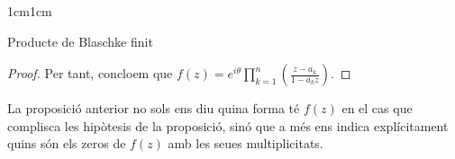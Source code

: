 \begin{adjustwidth}{1cm}{1cm}
\begin{subsection}{Producte de Blaschke finit}
\begin{proof}
        Per tant, concloem que $f(z)=e^{i\theta}\displaystyle\prod^{n}_{k=1}\left(\frac{z-a_k}{1-\overline{a_k}z}\right)$.
    \end{proof}

    \begin{nota}
        La proposició anterior no sols ens diu quina forma té $f(z)$ en el cas que complisca les hipòtesis de la proposició, sinó que a més ens indica explícitament quins són els zeros de $f(z)$ amb les seues multiplicitats.
    \end{nota}
\end{subsection}



\end{adjustwidth}